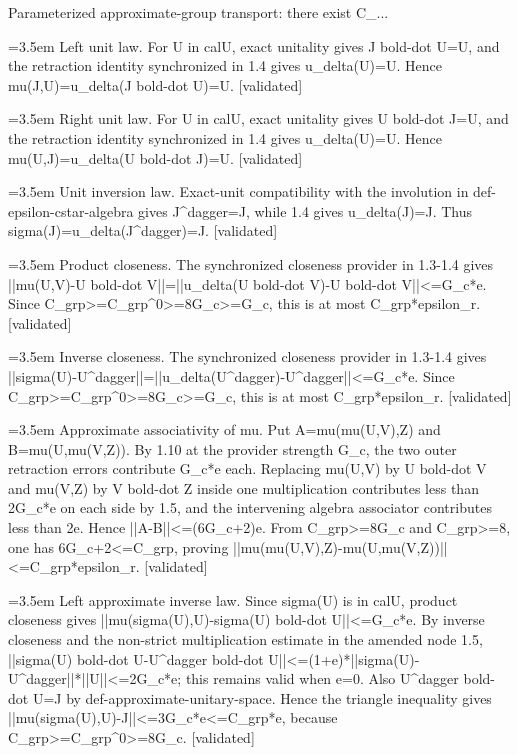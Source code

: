\documentclass{article}
\newcommand{\step}[1]{\par\noindent\hangindent=3.5em\hangafter=1%
  \makebox[3.5em][l]{\textbf{#1.}}}
\newcommand{\steptag}[1]{\hfill{\small\textsf{[#1]}}}
\begin{document}
\begin{proofbox}{Parameterized approximate-group transport: there exist C\_...}
\step{1.7} Left unit law. For U in calU, exact unitality gives J bold-dot U=U, and the retraction identity synchronized in 1.4 gives u\_delta(U)=U. Hence mu(J,U)=u\_delta(J bold-dot U)=U. \steptag{validated} \\[4pt]
\step{1.8} Right unit law. For U in calU, exact unitality gives U bold-dot J=U, and the retraction identity synchronized in 1.4 gives u\_delta(U)=U. Hence mu(U,J)=u\_delta(U bold-dot J)=U. \steptag{validated} \\[4pt]
\step{1.9} Unit inversion law. Exact-unit compatibility with the involution in def-epsilon-cstar-algebra gives J\textasciicircum{}dagger=J, while 1.4 gives u\_delta(J)=J. Thus sigma(J)=u\_delta(J\textasciicircum{}dagger)=J. \steptag{validated} \\[4pt]
\step{1.10} Product closeness. The synchronized closeness provider in 1.3-1.4 gives ||mu(U,V)-U bold-dot V||=||u\_delta(U bold-dot V)-U bold-dot V||<=G\_c*e. Since C\_grp>=C\_grp\textasciicircum{}0>=8G\_c>=G\_c, this is at most C\_grp*epsilon\_r. \steptag{validated} \\[4pt]
\step{1.11} Inverse closeness. The synchronized closeness provider in 1.3-1.4 gives ||sigma(U)-U\textasciicircum{}dagger||=||u\_delta(U\textasciicircum{}dagger)-U\textasciicircum{}dagger||<=G\_c*e. Since C\_grp>=C\_grp\textasciicircum{}0>=8G\_c>=G\_c, this is at most C\_grp*epsilon\_r. \steptag{validated} \\[4pt]
\step{1.12} Approximate associativity of mu. Put A=mu(mu(U,V),Z) and B=mu(U,mu(V,Z)). By 1.10 at the provider strength G\_c, the two outer retraction errors contribute G\_c*e each. Replacing mu(U,V) by U bold-dot V and mu(V,Z) by V bold-dot Z inside one multiplication contributes less than 2G\_c*e on each side by 1.5, and the intervening algebra associator contributes less than 2e. Hence ||A-B||<=(6G\_c+2)e. From C\_grp>=8G\_c and C\_grp>=8, one has 6G\_c+2<=C\_grp, proving ||mu(mu(U,V),Z)-mu(U,mu(V,Z))||<=C\_grp*epsilon\_r. \steptag{validated} \\[4pt]
\step{1.13} Left approximate inverse law. Since sigma(U) is in calU, product closeness gives ||mu(sigma(U),U)-sigma(U) bold-dot U||<=G\_c*e. By inverse closeness and the non-strict multiplication estimate in the amended node 1.5, ||sigma(U) bold-dot U-U\textasciicircum{}dagger bold-dot U||<=(1+e)*||sigma(U)-U\textasciicircum{}dagger||*||U||<=2G\_c*e; this remains valid when e=0. Also U\textasciicircum{}dagger bold-dot U=J by def-approximate-unitary-space. Hence the triangle inequality gives ||mu(sigma(U),U)-J||<=3G\_c*e<=C\_grp*e, because C\_grp>=C\_grp\textasciicircum{}0>=8G\_c. \steptag{validated} \\[4pt]

\end{proofbox}
\end{document}
